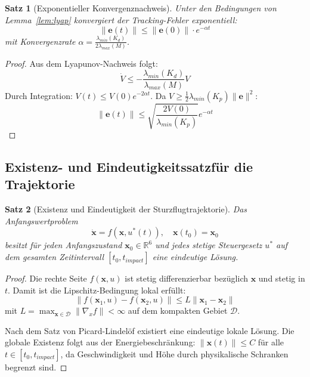 ﻿\documentclass[12pt,a4paper]{article}
\newtheorem{theorem}{Satz}[section]
\theoremstyle{remark}
\begin{document}
	\begin{theorem}[Exponentieller Konvergenznachweis]
		\label{thm:konvergenz}
		Unter den Bedingungen von Lemma~\ref{lem:lyap} konvergiert der Tracking-Fehler exponentiell:
		\begin{equation}
			\|\mathbf{e}(t)\| \leq \|\mathbf{e}(0)\| \cdot e^{-\alpha t}
		\end{equation}
		mit Konvergenzrate $\alpha = \frac{\lambda_{min}(K_d)}{2\lambda_{max}(M)}$.
	\end{theorem}
	
	\begin{proof}
		Aus dem Lyapunov-Nachweis folgt:
		\begin{equation}
			\dot{V} \leq -\frac{\lambda_{min}(K_d)}{\lambda_{max}(M)} V
		\end{equation}
		Durch Integration: $V(t) \leq V(0) e^{-2\alpha t}$. Da $V \geq \frac{1}{2}\lambda_{min}(K_p) \|\mathbf{e}\|^2$:
		\begin{equation}
			\|\mathbf{e}(t)\| \leq \sqrt{\frac{2V(0)}{\lambda_{min}(K_p)}} e^{-\alpha t}
		\end{equation}
	\end{proof}

	\subsection{Existenz- und Eindeutigkeitssatzfür die Trajektorie}
	
	\begin{theorem}[Existenz und Eindeutigkeit der Sturzflugtrajektorie]
		Das Anfangswertproblem
		\begin{equation}
			\dot{\mathbf{x}} = f(\mathbf{x}, u^*(t)), \quad \mathbf{x}(t_0) = \mathbf{x}_0
		\end{equation}
		besitzt für jeden Anfangszustand $\mathbf{x}_0 \in \mathbb{R}^6$ und jedes stetige Steuergesetz $u^*$ auf dem gesamten Zeitintervall $[t_0, t_{impact}]$ eine eindeutige Lösung.
	\end{theorem}
	
	\begin{proof}
		Die rechte Seite $f(\mathbf{x}, u)$ ist stetig differenzierbar bezüglich $\mathbf{x}$ und stetig in $t$. Damit ist die Lipschitz-Bedingung lokal erfüllt:
		\begin{equation}
			\|f(\mathbf{x}_1, u) - f(\mathbf{x}_2, u)\| \leq L \|\mathbf{x}_1 - \mathbf{x}_2\|
		\end{equation}
		mit $L = \max_{\mathbf{x} \in \mathcal{D}} \|\nabla_x f\| < \infty$ auf dem kompakten Gebiet $\mathcal{D}$.
		
		Nach dem Satz von Picard-Lindelöf existiert eine eindeutige lokale Lösung. Die globale Existenz folgt aus der Energiebeschränkung: $\|\mathbf{x}(t)\| \leq C$ für alle $t \in [t_0, t_{impact}]$, da Geschwindigkeit und Höhe durch physikalische Schranken begrenzt sind.
	\end{proof}
	
\end{document}
